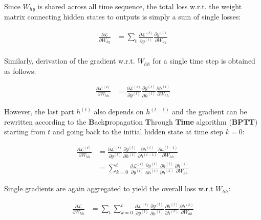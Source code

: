 \documentclass[]{krantz}
\begin{document}
Since \(W_{hy}\) is shared across all time sequence, the total loss w.r.t. the weight matrix connecting hidden states to outputs is simply a sum of single losses:

\begin{align}
\frac{\partial \mathcal{L}}{\partial W_{hy}} & = \sum_{t} \frac{\partial \mathcal{L^{(t)}}}{\partial y^{(t)}} \frac{\partial y^{(t)}} {\partial W_{hy}}  \label{eq:rnn-back-hy-all} \\    
\end{align}

Similarly, derivation of the gradient w.r.t. \(W_{hh}\) for a single time step is obtained as follows:

\begin{align}
\frac{\partial \mathcal{L^{(t)}}}{\partial W_{hh}} & = \frac{\partial \mathcal{L^{(t)}}}{\partial y^{(t)}} \frac{\partial y^{(t)}}{\partial h^{(t)}} \frac{\partial h^{(t)}}{\partial W_{hh}} \label{eq:rnn-back-hh-one}
\end{align}

However, the last part \(h^{(t)}\) also depends on \(h^{(t-1)}\) and the gradient can be rewritten according to the \textbf{B}ack\textbf{p}ropagation \textbf{T}hrough \textbf{Time} algorithm (\textbf{BPTT}) starting from \(t\) and going back to the initial hidden state at time step \(k=0\):

\begin{align}
\frac{\partial \mathcal{L^{(t)}}}{\partial W_{hh}}
& = \frac{\partial \mathcal{L^{(t)}}}{\partial y^{(t)}} \frac{\partial y^{(t)}}{\partial h^{(t)}} \frac{\partial h^{(t)}}{\partial h^{(t-1)}} \frac{\partial h^{(t-1)}}{\partial W_{hh}} \\
& = \sum_{k=0}^{t} \frac{\partial \mathcal{L^{(t)}}}{\partial y^{(t)}} \frac{\partial y^{(t)}}{\partial h^{(t)}} \frac{\partial h^{(t)}}{\partial h^{(k)}} \frac{\partial h^{(k)}}{\partial W_{hh}} \label{eq:rnn-back-hh-one-one}
\end{align}

Single gradients are again aggregated to yield the overall loss w.r.t \(W_{hh}\):

\begin{align}
\frac{\partial \mathcal{L}}{\partial W_{hh}}
& = \sum_{t} \sum_{k=0}^{t} \frac{\partial \mathcal{L^{(t)}}}{\partial y^{(t)}} \frac{\partial y^{(t)}}{\partial h^{(t)}} \frac{\partial h^{(t)}}{\partial h^{(k)}} \frac{\partial h^{(k)}}{\partial W_{hh}} \label{eq:rnn-back-hh-all}
\end{align}
\end{document}
